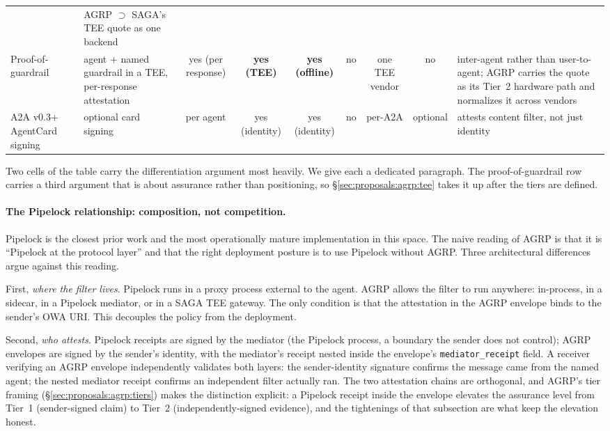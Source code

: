 \begin{table}[t]
{\begin{tabular}{p{2.7cm}p{2.6cm}cccccc p{2.5cm}}
      & AGRP $\supset$ SAGA's TEE quote as one backend \\
    Proof-of-guardrail~\cite{proof_of_guardrail}
      & agent + named guardrail in a TEE, per-response attestation
      & yes (per response) & \textbf{yes (TEE)} & \textbf{yes (offline)} & no & one TEE vendor & no
      & inter-agent rather than user-to-agent; AGRP carries the quote as its Tier~2 hardware path and normalizes it across vendors \\
    A2A v0.3+ AgentCard signing
      & optional card signing
      & per agent & yes (identity) & yes (identity) & no & per-A2A & optional
      & attests content filter, not just identity \\
    \bottomrule
  \end{tabular}%
  }
\end{table}

Two cells of the table carry the differentiation argument
most heavily. We give each a dedicated paragraph. The
proof-of-guardrail row~\cite{proof_of_guardrail} carries a
third argument that is about assurance rather than
positioning, so \S\ref{sec:proposals:agrp:tee} takes it up
after the tiers are defined.

\paragraph{The Pipelock relationship: composition, not competition.}
Pipelock is the closest prior work and the most
operationally mature implementation in this space. The
naive reading of AGRP is that it is ``Pipelock at the
protocol layer'' and that the right deployment posture is
to use Pipelock without AGRP. Three architectural
differences argue against this reading.

First, \emph{where the filter lives}. Pipelock runs in a
proxy process external to the agent. AGRP allows the
filter to run anywhere: in-process, in a sidecar, in a
Pipelock mediator, or in a SAGA TEE gateway. The only
condition is that the attestation in the AGRP envelope
binds to the sender's OWA URI. This decouples the policy from the
deployment.

Second, \emph{who attests}. Pipelock receipts are signed
by the mediator (the Pipelock process, a boundary the
sender does not control); AGRP envelopes are signed by
the sender's identity, with the mediator's receipt
nested inside the envelope's \texttt{mediator\_receipt}
field. A receiver verifying an AGRP envelope
independently validates both layers: the
sender-identity signature confirms the message came
from the named agent; the nested mediator receipt
confirms an independent filter actually ran. The two
attestation chains are orthogonal, and AGRP's tier
framing (\S\ref{sec:proposals:agrp:tiers}) makes the
distinction explicit: a Pipelock receipt inside the
envelope elevates the assurance level from Tier~1
(sender-signed claim) to Tier~2 (independently-signed
evidence), and the tightenings of that subsection are
what keep the elevation honest.

